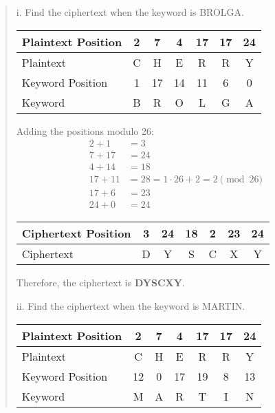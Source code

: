 \documentclass[12pt]{article}
\begin{document}
\begin{quote}
i. Find the ciphertext when the keyword is BROLGA.

\vspace{0.3cm}

\begin{center}
\begin{tabular}{|l|c|c|c|c|c|c|}
\hline
Plaintext Position & 2 & 7 & 4 & 17 & 17 & 24 \\
\hline
Plaintext & C & H & E & R & R & Y \\
\hline
Keyword Position & 1 & 17 & 14 & 11 & 6 & 0 \\
\hline
Keyword & B & R & O & L & G & A \\
\hline
\end{tabular}
\end{center}

\vspace{0.5cm}

Adding the positions modulo 26:
\begin{align*}
2 + 1 &= 3\\
7 + 17 &= 24\\
4 + 14 &= 18\\
17 + 11 &= 28 = 1 \cdot 26 + 2 = 2 \pmod{26}\\
17 + 6 &= 23\\
24 + 0 &= 24
\end{align*}

\vspace{0.5cm}

\begin{center}
\begin{tabular}{|l|c|c|c|c|c|c|}
\hline
Ciphertext Position & 3 & 24 & 18 & 2 & 23 & 24 \\
\hline
Ciphertext & D & Y & S & C & X & Y \\
\hline
\end{tabular}
\end{center}

\vspace{0.5cm}

Therefore, the ciphertext is \textbf{DYSCXY}.

\vspace{0.5cm}

ii. Find the ciphertext when the keyword is MARTIN.

\vspace{0.3cm}

\begin{center}
\begin{tabular}{|l|c|c|c|c|c|c|}
\hline
Plaintext Position & 2 & 7 & 4 & 17 & 17 & 24 \\
\hline
Plaintext & C & H & E & R & R & Y \\
\hline
Keyword Position & 12 & 0 & 17 & 19 & 8 & 13 \\
\hline
Keyword & M & A & R & T & I & N \\
\hline
\end{tabular}
\end{center}


\end{quote}
\end{document}
